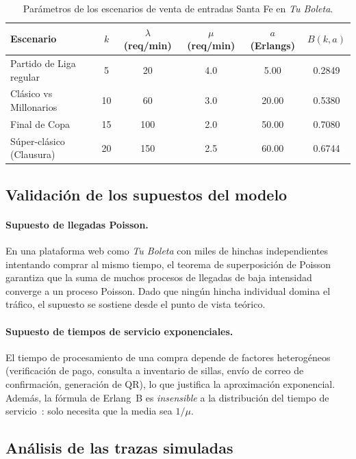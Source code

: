 \begin{table}[H]
\centering
\caption{Parámetros de los escenarios de venta de entradas Santa Fe en \emph{Tu Boleta}.}
\label{tab:escenarios_tuboleta}
\begin{tabular}{lccccc}
\toprule
\textbf{Escenario} & $k$ & $\lambda$ (req/min) & $\mu$ (req/min) & $a$ (Erlangs) & $B(k,a)$ \\
\midrule
Partido de Liga regular & 5 & 20 & 4.0 & 5.00 & 0.2849 \\
Clásico vs Millonarios & 10 & 60 & 3.0 & 20.00 & 0.5380 \\
Final de Copa & 15 & 100 & 2.0 & 50.00 & 0.7080 \\
Súper-clásico (Clausura) & 20 & 150 & 2.5 & 60.00 & 0.6744 \\
\bottomrule
\end{tabular}
\end{table}

\subsection*{Validación de los supuestos del modelo}

\paragraph{Supuesto de llegadas Poisson.}
En una plataforma web como \emph{Tu Boleta} con miles de hinchas independientes intentando
comprar al mismo tiempo, el teorema de superposición de Poisson garantiza que la suma de
muchos procesos de llegadas de baja intensidad converge a un proceso Poisson. Dado que
ningún hincha individual domina el tráfico, el supuesto se sostiene desde el punto de
vista teórico.

\paragraph{Supuesto de tiempos de servicio exponenciales.}
El tiempo de procesamiento de una compra depende de factores heterogéneos (verificación de
pago, consulta a inventario de sillas, envío de correo de confirmación, generación de QR),
lo que justifica la aproximación exponencial. Además, la fórmula de Erlang~B es
\emph{insensible} a la distribución del tiempo de servicio~\cite{bonald2003}: solo necesita que la media
sea $1/\mu$.

\subsection*{Análisis de las trazas simuladas}

